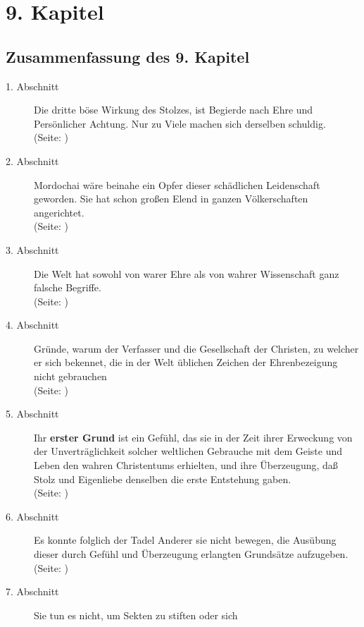 

\chapter{9. Kapitel} \label{kap9}


\section{Zusammenfassung des 9. Kapitel}
\footnotesize
\begin{description}
\item[1. Abschnitt] Die dritte böse Wirkung des Stolzes, ist Begierde nach Ehre
und Persönlicher Achtung. Nur zu Viele machen sich derselben schuldig.
\\ (Seite: \pageref{kap9_ab1})
\item[2. Abschnitt] Mordochai wäre beinahe ein Opfer dieser schädlichen
Leidenschaft geworden. Sie hat schon großen Elend in ganzen Völkerschaften
angerichtet.
\\ (Seite: \pageref{kap9_ab2})
\item[3. Abschnitt] Die Welt hat sowohl von warer Ehre als von wahrer
Wissenschaft ganz falsche Begriffe.
\\ (Seite: \pageref{kap9_ab3})
\item[4. Abschnitt] Gründe, warum der Verfasser und die Gesellschaft der
Christen, zu welcher er sich bekennet, die in der Welt üblichen Zeichen der
Ehrenbezeigung nicht gebrauchen
\\ (Seite: \pageref{kap9_ab4})
\item[5. Abschnitt] Ihr \textbf{erster Grund} ist ein Gefühl, das sie in der
Zeit ihrer
Erweckung von der Unverträglichkeit solcher weltlichen Gebrauche mit dem Geiste
und Leben den wahren Christentums erhielten, und ihre Überzeugung, daß Stolz
und Eigenliebe denselben die erste Entstehung gaben.
\\ (Seite: \pageref{kap9_ab5})
\item[6. Abschnitt] Es konnte folglich der Tadel Anderer sie nicht bewegen, die
Ausübung dieser durch Gefühl und Überzeugung erlangten Grundsätze aufzugeben.
\\ (Seite: \pageref{kap9_ab6})
\item[7. Abschnitt] Sie tun es nicht, um Sekten zu stiften oder sich

\end{description}

